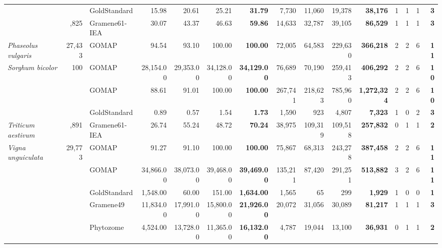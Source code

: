 \documentclass[utf8]{frontiersSCNS}
\begin{document}
\begin{table}[t]
{\begin{threeparttable}
\begin{tabular}{lrlrrr>{\bfseries}r|rrr>{\bfseries}r|rrr>{\bfseries}r}
 &  & GoldStandard & 15.98 & 20.61 & 25.21 & 31.79 & 7,730 & 11,060 & 19,378 & 38,176 & 1 & 1 & 1 & 3\\

\rowcolor{gray!6}  \multirow{-3}{*}{\raggedright\arraybackslash \textit{Oryza sativa}} & \multirow{-3}{*}{\raggedleft\arraybackslash 35,825} & Gramene61-IEA & 30.07 & 43.37 & 46.63 & 59.86 & 14,633 & 32,787 & 39,105 & 86,529 & 1 & 1 & 1 & 3\\
\cmidrule{1-15}
\textit{Phaseolus vulgaris} & 27,433 & GOMAP & 94.54 & 93.10 & 100.00 & 100.00 & 72,005 & 64,583 & 229,630 & 366,218 & 2 & 2 & 6 & 11\\
\cmidrule{1-15}
\rowcolor{gray!6}  \textit{Sorghum bicolor} & 100 & GOMAP & 28,154.00 & 29,353.00 & 34,128.00 & 34,129.00 & 76,689 & 70,190 & 259,413 & 406,292 & 2 & 2 & 6 & 10\\
\cmidrule{1-15}
 &  & GOMAP & 88.61 & 91.01 & 100.00 & 100.00 & 267,741 & 218,623 & 785,960 & 1,272,324 & 2 & 2 & 6 & 10\\

\rowcolor{gray!6}   &  & GoldStandard & 0.89 & 0.57 & 1.54 & 1.73 & 1,590 & 923 & 4,807 & 7,323 & 1 & 0 & 2 & 3\\

\multirow{-3}{*}{\raggedright\arraybackslash \textit{Triticum aestivum}} & \multirow{-3}{*}{\raggedleft\arraybackslash 107,891} & Gramene61-IEA & 26.74 & 55.24 & 48.72 & 70.24 & 38,975 & 109,319 & 109,518 & 257,832 & 0 & 1 & 1 & 2\\
\cmidrule{1-15}
\rowcolor{gray!6}  \textit{Vigna unguiculata} & 29,773 & GOMAP & 91.27 & 91.10 & 100.00 & 100.00 & 75,867 & 68,313 & 243,278 & 387,458 & 2 & 2 & 6 & 11\\
\cmidrule{1-15}
 &  & GOMAP & 34,866.00 & 38,073.00 & 39,468.00 & 39,469.00 & 135,211 & 87,420 & 291,251 & 513,882 & 3 & 2 & 6 & 11\\

\rowcolor{gray!6}   &  & GoldStandard & 1,548.00 & 60.00 & 151.00 & 1,634.00 & 1,565 & 65 & 299 & 1,929 & 1 & 0 & 0 & 1\\

 &  & Gramene49 & 11,834.00 & 17,991.00 & 15,800.00 & 21,926.00 & 20,072 & 31,056 & 30,089 & 81,217 & 1 & 1 & 1 & 3\\

\rowcolor{gray!6}  \multirow{-4}{*}{\raggedright\arraybackslash \textit{Zea mays} B73.v3} &  & Phytozome & 4,524.00 & 13,728.00 & 11,365.00 & 16,132.00 & 4,787 & 19,044 & 13,100 & 36,931 & 0 & 1 & 1 & 2\\


\end{tabular}
\end{threeparttable}}
\end{table}
\end{document}

